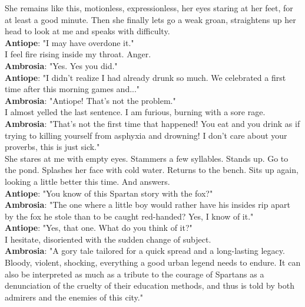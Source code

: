 \documentclass{report}
\newcommand{\speaker}[1]{
	\textbf{#1}: 
}
\begin{document}
She remains like this, motionless, expressionless, her eyes staring at her feet, for at least a good minute. Then she finally lets go a weak groan, straightens up her head to look at me and speaks with difficulty.\\

\speaker{Antiope} "I may have overdone it."\\

I feel fire rising inside my throat. Anger.\\

\speaker{Ambrosia} "Yes. Yes you did."\\

\speaker{Antiope} "I didn't realize I had already drunk so much. We celebrated a first time after this morning games and..."\\

\speaker{Ambrosia} "Antiope! That's not the problem."\\

I almost yelled the last sentence. I am furious, burning with a sore rage.\\

\speaker{Ambrosia} "That's not the first time that happened! You eat and you drink as if trying to killing yourself from asphyxia and drowning! I don't care about your proverbs, this is just sick."\\

She stares at me with empty eyes. Stammers a few syllables. Stands up. Go to the pond. Splashes her face with cold water. Returns to the bench. Sits up again, looking a little better this time. And answers.\\

\speaker{Antiope} "You know of this Spartan story with the fox?"\\

\speaker{Ambrosia} "The one where a little boy would rather have his insides rip apart by the fox he stole than to be caught red-handed? Yes, I know of it."\\

\speaker{Antiope} "Yes, that one. What do you think of it?"\\

I hesitate, disoriented with the sudden change of subject.\\

\speaker{Ambrosia} "A gory tale tailored for a quick spread and a long-lasting legacy. Bloody, violent, shocking, everything a good urban legend needs to endure. It can also be interpreted as much as a tribute to the courage of Spartans as a denunciation of the cruelty of their education methods, and thus is told by both admirers and the enemies of this city."\\
\end{document}
